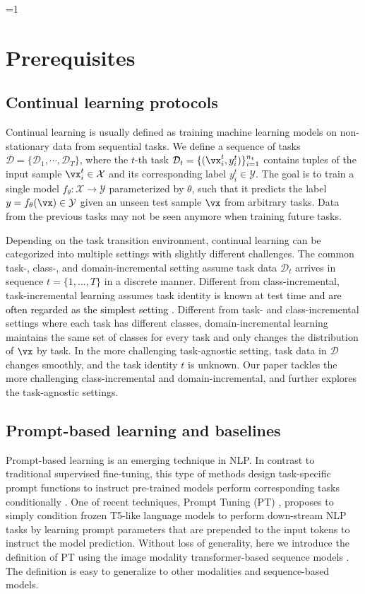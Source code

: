 \documentclass[10pt,twocolumn,letterpaper]{article}
\newcommand{\zifeng}[1]{\textcolor{black}{#1}}
\newcounter{alphasect}
\def\alphainsection{0}
\let\oldsection=\section
\def\section{%
  \ifnum\alphainsection=1%
    \addtocounter{alphasect}{1}
  \fi%
\oldsection}%
\begin{document}
\section{Prerequisites}

\subsection{Continual learning protocols}
Continual learning is usually defined as training machine learning models on non-stationary data from sequential tasks. 
We define a sequence of tasks $\mathcal{D} = \{\mathcal{D}_1, \cdots, \mathcal{D}_T\}$, where the $t$-th task $\mathcal{D}_t=\{(\vx^t_i, y^t_i)\}_{i=1}^{n_t}$ contains tuples of the input sample $\vx^t_i \in \mathcal{X}$ and its corresponding label $y^t_i \in \mathcal{Y}$. %
The goal is to train a single model $f_\theta: \mathcal{X} \to \mathcal{Y}$ parameterized by $\theta$, such that it predicts the label $y = f_\theta(\vx) \in \mathcal{Y}$ given an unseen test sample $\vx$ from arbitrary tasks. 
Data from the previous tasks may not be seen anymore when training future tasks. 

Depending on the task transition environment, continual learning can be categorized into multiple settings with slightly different challenges.
The common task-, class-, and domain-incremental setting assume task data $\mathcal{D}_t$ arrives in sequence $t=\{1,..., T\}$ in a discrete manner. Different from class-incremental, task-incremental learning assumes task identity is known at test time \zifeng{and are often regarded as the simplest setting \cite{mai2021online, mehrabi2021survey}.}
Different from task- and class-incremental settings where each task has different classes, domain-incremental learning maintains the same set of classes for every task and only changes the distribution of $\vx$ by task. 
In the more challenging task-agnostic setting, task data in $\mathcal{D}$ changes smoothly, and the task identity $t$ is unknown. 
Our paper tackles the more challenging class-incremental and domain-incremental, and further explores the task-agnostic settings. 

\subsection{Prompt-based learning and baselines} \label{subsec:pt}
Prompt-based learning is an emerging technique in NLP. 
In contrast to traditional supervised fine-tuning, this type of methods design task-specific prompt functions to instruct pre-trained models perform corresponding tasks conditionally \cite{liu2021pre}.
One of recent techniques, Prompt Tuning (PT) \cite{lester2021power}, proposes to simply condition frozen T5-like language models \cite{raffel2020exploring} to perform down-stream NLP tasks by learning prompt parameters that are prepended to the input tokens to instruct the model prediction. 
Without loss of generality, here we introduce the definition of PT using the image modality transformer-based sequence models \cite{dosovitskiy2020image,vaswani2017attention}. 
The definition is easy to generalize to other modalities and sequence-based models. 
\end{document}
